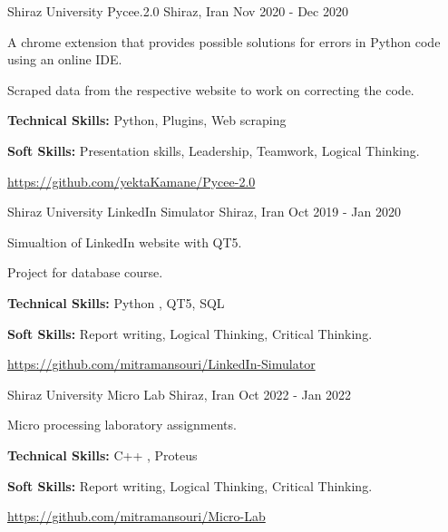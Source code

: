 \begin{cventries}
  \cventry
    {Shiraz University} %
    {Pycee.2.0} %
    {Shiraz, Iran} %
    {Nov 2020 - Dec 2020} %
    {
      \begin{cvitems} %
        \item {A chrome extension that provides possible solutions for errors in Python code using an online IDE.}
        \item {Scraped data from the respective website to work on correcting the code.}
        \item {\textbf{Technical Skills:} Python, Plugins, Web scraping}
        \item {\textbf{Soft Skills:} Presentation skills, Leadership, Teamwork, Logical Thinking.}
        \item {\hyperlink{Link:}{https://github.com/yektaKamane/Pycee-2.0}}
      \end{cvitems}
    }

  \cventry
    {Shiraz University} %
    {LinkedIn Simulator} %
    {Shiraz, Iran} %
    {Oct 2019 - Jan 2020} %
    {
      \begin{cvitems} %
        \item {Simualtion of LinkedIn website with QT5.}
        \item {Project for database course.}
        \item {\textbf{Technical Skills:} Python , QT5, SQL}
        \item {\textbf{Soft Skills:} Report writing, Logical Thinking, Critical Thinking.}
        \item {\hyperlink{Link:}{https://github.com/mitramansouri/LinkedIn-Simulator}}
      \end{cvitems}
    }

  \cventry
    {Shiraz University} %
    {Micro Lab} %
    {Shiraz, Iran} %
    {Oct 2022 - Jan 2022} %
    {
      \begin{cvitems} %
        \item {Micro processing laboratory assignments.}
        \item {\textbf{Technical Skills:} C++ , Proteus}
        \item {\textbf{Soft Skills:} Report writing, Logical Thinking, Critical Thinking.}
        \item {\hyperlink{Link:}{https://github.com/mitramansouri/Micro-Lab}}
      \end{cvitems}
    }


\end{cventries}
